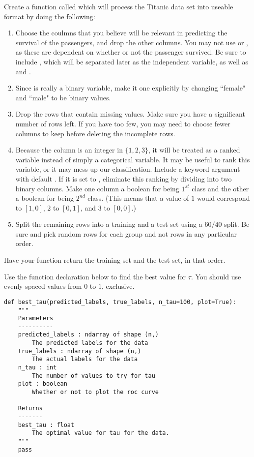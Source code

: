 
Create a function called  which will process the Titanic data set into useable format by doing the following:
\begin{enumerate}
\item Choose the coulmns that you believe will be relevant in predicting the survival of the passengers, and drop the other columns.  You may not use  or , as these are dependent on whether or not the passenger survived.  Be sure to include , which will be separated later as the independent variable, as well as  and .
\item Since  is really a binary variable, make it one explicitly by changing ``female" and ``male" to be binary values.
\item Drop the rows that contain missing values.  Make sure you have a significant number of rows left.  If you have too few, you may need to choose fewer columns to keep before deleting the incomplete rows.
\item Because the  column is an integer in $\{1, 2, 3\}$, it will be treated as a ranked variable instead of simply a categorical variable.  It may be useful to rank this variable, or it may mess up our classification.  Include a keyword argument  with default .  If it is set to , eliminate this ranking by dividing  into two binary columns.  Make one column a boolean for being $1^{st}$ class and the other a boolean for being $2^{nd}$ class. (This means that a value of $1$ would correspond to $[1, 0]$, $2$ to $[0, 1]$, and $3$ to $[0, 0]$.)
\item Split the remaining rows into a training and a test set using a $60/40$ split.  Be sure and pick random rows for each group and not rows in any particular order.
\end{enumerate}
Have your function return the training set and the test set, in that order.

Use the function declaration below to find the best value for $\tau$.  You should use evenly spaced values from $0$ to $1$, exclusive.
\begin{lstlisting}
def best_tau(predicted_labels, true_labels, n_tau=100, plot=True):
    """
    Parameters
    ----------
    predicted_labels : ndarray of shape (n,)
        The predicted labels for the data
    true_labels : ndarray of shape (n,)
        The actual labels for the data
    n_tau : int
        The number of values to try for tau
    plot : boolean
        Whether or not to plot the roc curve

    Returns
    -------
    best_tau : float
        The optimal value for tau for the data.
    """
    pass
\end{lstlisting}

